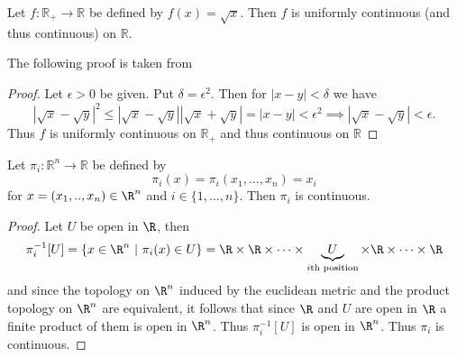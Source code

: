 	 	 \hrulefill
	 	 
	 	 \medskip
	 	 
	 \begin{result}
	 		Let $f : \mathbb{R_{+}} \to \mathbb{R}$ be defined by $f(x) = \sqrt{x}$. Then $f$ is uniformly continuous (and thus continuous) on $\mathbb{R}$. 
	 \end{result}
	 
	 The following proof is taken from \cite{sqrtx}
	 
	 \begin{proof}
	 	Let $\epsilon > 0$ be given. Put $\delta = \epsilon^2$. Then for $|x-y| < \delta$ we have  $$|\sqrt x - \sqrt y|^2 \leq |\sqrt x - \sqrt y||\sqrt x + \sqrt y| = |x-y| < \epsilon^2 \implies |\sqrt x - \sqrt y| < \epsilon. $$ Thus $f$ is uniformly continuous on $\mathbb{R}_{+}$ and thus continuous on $\mathbb{R}$
	 \end{proof}

	 
	 \begin{result}
	 	Let $\pi_i : \mathbb{R}^n \to \mathbb{R}$ be defined by $$\pi_i(x) = \pi_i(x_1, ..., x_n) = x_i$$ for $x = (x_1, .., x_n) \in \R^n$ and $i \in \{1, \dots, n\}$. Then $\pi_i$ is continuous.
	 \end{result}
	 
	 \begin{proof}
	 	Let $U$ be open in $\R$, then $$\pi_i^{-1}[U] = \left\lbrace x \in \R^n \ | \ \pi_i(x) \in U \right\rbrace = \R \times \R \times \dots \times\underbrace{U}_{\text{$i$th position}} \times \R \times \dots \times \R$$ and since the topology on $\R^n$ induced by the euclidean metric and the product topology on $\R^n$ are equivalent, it follows that since $\R$ and $U$ are open in $\R$ a finite product of them is open in $\R^n$. Thus $\pi_i^{-1}[U]$ is open in $\R^n$. Thus $\pi_i$ is continuous.
	 \end{proof}
	 
	 
